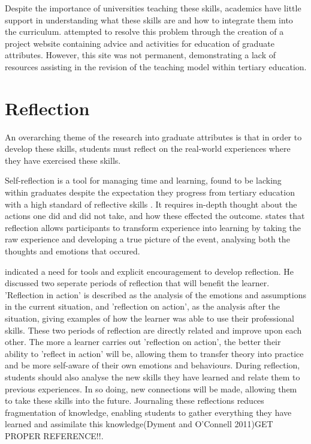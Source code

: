 \documentclass{l4proj}
\begin{document}
Despite the importance of universities teaching these skills, academics have little support in understanding what these skills are and how to integrate them into the curriculum. \citet{litchfield_contextualising_2010} attempted to resolve this problem through the creation of a project website containing advice and activities for education of graduate attributes. However, this site was not permanent, demonstrating a lack of resources assisting in the revision of the teaching model within tertiary education. 


\section{Reflection} \label{backgroundReflection}

An overarching theme of the research into graduate attributes is that in order to develop these skills, students must reflect on the real-world experiences where they have exercised these skills. 

Self-reflection is a tool for managing time and learning, found to be lacking within graduates \citep{thurner_development_2020} despite the expectation they progress from tertiary education with a high standard of reflective skills \citep{bruno_reflective_2018}. It requires in-depth thought about the actions one did and did not take, and how these effected the outcome. \citet{boud_using_2001} states that reflection allows participants to transform experience into learning by taking the raw experience and developing a true picture of the event, analysing both the thoughts and emotions that occured. 

\citet{schon_reflective_1984} indicated a need for tools and explicit encouragement to develop reflection. He discussed two seperate periods of reflection that will benefit the learner. 'Reflection in action' is described as the analysis of the emotions and assumptions in the current situation, and 'reflection on action', as the analysis after the situation, giving examples of how the learner was able to use their professional skills. These two periods of reflection are directly related and improve upon each other. The more a learner carries out 'reflection on action', the better their ability to 'reflect in action' will be, allowing them to transfer theory into practice and be more self-aware of their own emotions and behaviours. During reflection, students should also analyse the new skills they have learned and relate them to previous experiences. In so doing, new connections will be made, allowing them to take these skills into the future. Journaling these reflections reduces fragmentation of knowledge, enabling students to gather everything they have learned and assimilate this knowledge(Dyment and O'Connell 2011)GET PROPER REFERENCE!!.
\end{document}
